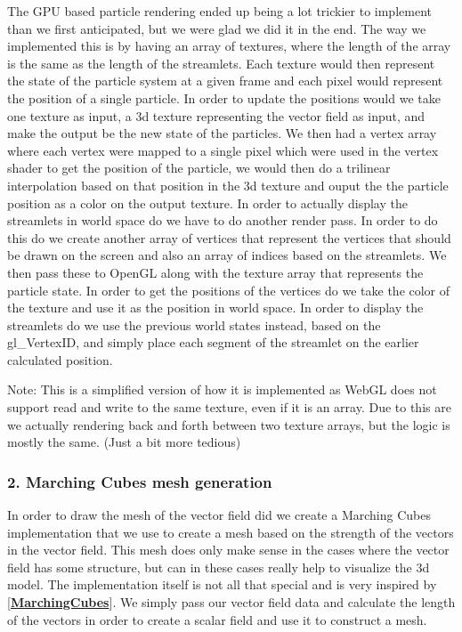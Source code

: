 \documentclass{article}
\newcommand{\reference}[1]{[\hyperref[ref:#1]{\textbf{#1}}]}
\begin{document}
The GPU based particle rendering ended up being a lot trickier to implement than we first anticipated, but we were glad we did it in the end. The way we implemented this is by having an array of textures, where the length of the array is the same as the length of the streamlets. Each texture would then represent the state of the particle system at a given frame and each pixel would represent the position of a single particle. In order to update the positions would we take one texture as input, a 3d texture representing the vector field as input, and make the output be the new state of the particles. We then had a vertex array where each vertex were mapped to a single pixel which were used in the vertex shader to get the position of the particle, we would then do a trilinear interpolation based on that position in the 3d texture and ouput the the particle position as a color on the output texture. In order to actually display the streamlets in world space do we have to do another render pass. In order to do this do we create another array of vertices that represent the vertices that should be drawn on the screen and also an array of indices based on the streamlets. We then pass these to OpenGL along with the texture array that represents the particle state. In order to get the positions of the vertices do we take the color of the texture and use it as the position in world space. In order to display the streamlets do we use the previous world states instead, based on the gl\_VertexID, and simply place each segment of the streamlet on the earlier calculated position.


Note: This is a simplified version of how it is implemented as WebGL does not support read and write to the same texture, even if it is an array. Due to this are we actually rendering back and forth between two texture arrays, but the logic is mostly the same. (Just a bit more tedious)

\subsubsection*{2. Marching Cubes mesh generation}

In order to draw the mesh of the vector field did we create a Marching Cubes implementation that we use to create a mesh based on the strength of the vectors in the vector field. This mesh does only make sense in the cases where the vector field has some structure, but can in these cases really help to visualize the 3d model. The implementation itself is not all that special and is very inspired by \reference{MarchingCubes}. We simply pass our vector field data and calculate the length of the vectors in order to create a scalar field and use it to construct a mesh. 
\end{document}
